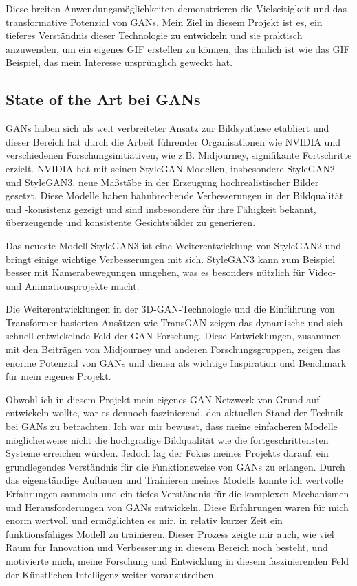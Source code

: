 \documentclass[a4paper, 12pt]{article}
\begin{document}
Diese breiten Anwendungsmöglichkeiten demonstrieren die Vielseitigkeit und das transformative Potenzial von GANs. Mein Ziel in diesem Projekt ist es, ein tieferes Verständnis dieser Technologie zu entwickeln und sie praktisch anzuwenden, um ein eigenes GIF erstellen zu können, das ähnlich ist wie das GIF Beispiel, das mein Interesse ursprünglich geweckt hat.

\subsection{State of the Art bei GANs}
GANs haben sich als weit verbreiteter Ansatz zur Bildsynthese etabliert und dieser Bereich hat durch die Arbeit führender Organisationen wie NVIDIA und verschiedenen Forschungsinitiativen, wie z.B. Midjourney, signifikante Fortschritte erzielt. NVIDIA hat mit seinen StyleGAN-Modellen, insbesondere StyleGAN2 und StyleGAN3, neue Maßstäbe in der Erzeugung hochrealistischer Bilder gesetzt\cite{StyleGAN3, StyleGAN3_Github, StyleGAN2}. Diese Modelle haben bahnbrechende Verbesserungen in der Bildqualität und -konsistenz gezeigt und sind insbesondere für ihre Fähigkeit bekannt, überzeugende und konsistente Gesichtsbilder zu generieren\cite{StyleGAN3, StyleGAN3_Github}.

Das neueste Modell StyleGAN3 ist eine Weiterentwicklung von StyleGAN2 und bringt einige wichtige Verbesserungen mit sich. StyleGAN3 kann zum Beispiel besser mit Kamerabewegungen umgehen, was es besonders nützlich für Video- und Animationsprojekte macht\cite{StyleGAN3_next}.

Die Weiterentwicklungen in der 3D-GAN-Technologie und die Einführung von Transformer-basierten Ansätzen wie TransGAN zeigen das dynamische und sich schnell entwickelnde Feld der GAN-Forschung\cite{jiang2021transgan}. Diese Entwicklungen, zusammen mit den Beiträgen von Midjourney und anderen Forschungsgruppen, zeigen das enorme Potenzial von GANs und dienen als wichtige Inspiration und Benchmark für mein eigenes Projekt.


Obwohl ich in diesem Projekt mein eigenes GAN-Netzwerk von Grund auf entwickeln wollte, war es dennoch faszinierend, den aktuellen Stand der Technik bei GANs zu betrachten. Ich war mir bewusst, dass meine einfacheren Modelle möglicherweise nicht die hochgradige Bildqualität wie die fortgeschrittensten Systeme erreichen würden. Jedoch lag der Fokus meines Projekts darauf, ein grundlegendes Verständnis für die Funktionsweise von GANs zu erlangen. Durch das eigenständige Aufbauen und Trainieren meines Modells konnte ich wertvolle Erfahrungen sammeln und ein tiefes Verständnis für die komplexen Mechanismen und Herausforderungen von GANs entwickeln. Diese Erfahrungen waren für mich enorm wertvoll und ermöglichten es mir, in relativ kurzer Zeit ein funktionsfähiges Modell zu trainieren. Dieser Prozess zeigte mir auch, wie viel Raum für Innovation und Verbesserung in diesem Bereich noch besteht, und motivierte mich, meine Forschung und Entwicklung in diesem faszinierenden Feld der Künstlichen Intelligenz weiter voranzutreiben.
\end{document}
